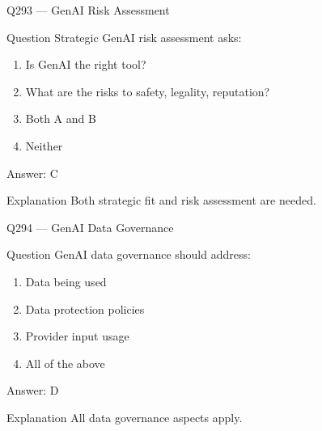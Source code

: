 \documentclass[aspectratio=169,8pt]{beamer}
\begin{document}
										\begin{frame}{Q293 --- GenAI Risk Assessment}
											\begin{block}{Question}
												Strategic GenAI risk assessment asks:
												\begin{enumerate}
													\item Is GenAI the right tool?
													\item What are the risks to safety, legality, reputation?
													\item Both A and B
													\item Neither
												\end{enumerate}
											\end{block}
											\begin{exampleblock}{Answer: C}\end{exampleblock}
											\begin{block}{Explanation}
												Both strategic fit and risk assessment are needed.
											\end{block}
										\end{frame}
										
										\begin{frame}{Q294 --- GenAI Data Governance}
											\begin{block}{Question}
												GenAI data governance should address:
												\begin{enumerate}
													\item Data being used
													\item Data protection policies
													\item Provider input usage
													\item All of the above
												\end{enumerate}
											\end{block}
											\begin{exampleblock}{Answer: D}\end{exampleblock}
											\begin{block}{Explanation}
												All data governance aspects apply.
											\end{block}
										\end{frame}
										
\end{document}
